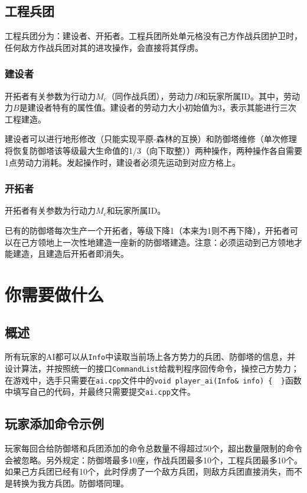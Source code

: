 \documentclass[a4paper,4pt]{article}
\begin{document}
\subsection{工程兵团}
工程兵团分为：建设者、开拓者。工程兵团所处单元格没有己方作战兵团护卫时，任何敌方作战兵团对其的进攻操作，会直接将其俘虏。\par

\subsubsection{建设者}
开拓者有关参数为行动力$M_c$（同作战兵团），劳动力$B$和玩家所属ID。其中，劳动力$B$是建设者特有的属性值。建设者的劳动力大小初始值为3，表示其能进行三次工程建造。\par %
建设者可以进行地形修改（只能实现平原-森林的互换）和防御塔维修（单次修理将恢复防御塔该等级最大生命值的1/3（向下取整））两种操作，两种操作各自需要1点劳动力消耗。发起操作时，建设者必须先运动到对应方格上。
\subsubsection{开拓者}
开拓者有关参数为行动力$M_c$和玩家所属ID。\par
已有的防御塔每次生产一个开拓者，等级下降1（本来为1则不再下降），开拓者可以在己方领地上一次性地建造一座新的防御塔建造。注意：必须运动到己方领地才能建造，且建造后开拓者即消失。




\section{你需要做什么}
\subsection{概述}
所有玩家的AI都可以从\texttt{Info}中读取当前场上各方势力的兵团、防御塔的信息，并设计算法，并按照统一的接口\texttt{CommandList}给裁判程序回传命令，操控己方势力；在游戏中，选手只需要在\texttt{ai.cpp}文件中的\texttt{void player\_ai(Info\& info) \{ \   \}}函数中填写自己的代码，并最终只需要提交\texttt{ai.cpp}文件。

\subsection{玩家添加命令示例}
玩家每回合给防御塔和兵团添加的命令总数量不得超过50个，超出数量限制的命令会被忽略。另外规定：防御塔最多10座，作战兵团最多10个，工程兵团最多10个。如果己方兵团已经有10个，此时俘虏了一个敌方兵团，则敌方兵团直接消失，而不是转换为我方兵团。防御塔同理。
\end{document}
